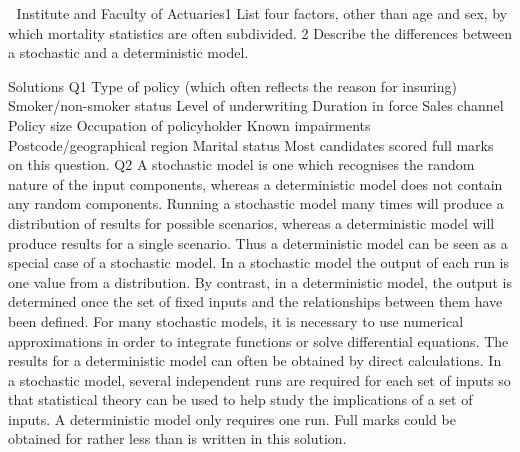  Institute and Faculty of Actuaries1
List four factors, other than age and sex, by which mortality statistics are often
subdivided. 
2 Describe the differences between a stochastic and a deterministic model. 



Solutions
Q1
Type of policy (which often reflects the reason for insuring)
Smoker/non-smoker status
Level of underwriting
Duration in force
Sales channel
Policy size
Occupation of policyholder
Known impairments
Postcode/geographical region
Marital status
Most candidates scored full marks on this question.
Q2
A stochastic model is one which recognises the random nature of the input
components, whereas a deterministic model does not contain any random
components.
Running a stochastic model many times will produce a distribution of results for
possible scenarios, whereas a deterministic model will produce results for a single
scenario.
Thus a deterministic model can be seen as a special case of a stochastic model.
In a stochastic model the output of each run is one value from a distribution.
By contrast, in a deterministic model, the output is determined once the set of fixed
inputs and the relationships between them have been defined.
For many stochastic models, it is necessary to use numerical approximations in order
to integrate functions or solve differential equations.
The results for a deterministic model can often be obtained by direct calculations.
In a stochastic model, several independent runs are required for each set of inputs so
that statistical theory can be used to help study the implications of a set of inputs.
A deterministic model only requires one run.
Full marks could be obtained for rather less than is written in this solution.
